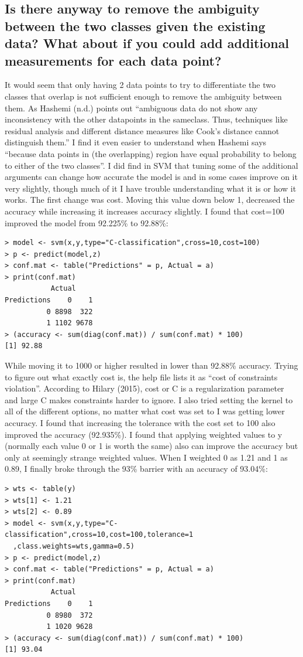 \documentclass[10pt]{article}
\begin{document}
\subsection*{Is there anyway to remove the ambiguity between the two classes given the existing data?  What about if you could add additional measurements for each data point?}
It would seem that only having 2 data points to try to differentiate the two classes that overlap is not sufficient enough to remove the ambiguity between them. As Hashemi (n.d.) points out “ambiguous data do not show any inconsistency with the other datapoints in the sameclass. Thus, techniques like residual analysis and different distance measures like Cook’s distance cannot distinguish them.” I find it even easier to understand when Hashemi says “because data points in (the overlapping) region have equal probability to belong to either of the two classes”. I did find in SVM that tuning some of the additional arguments can change how accurate the model is and in some cases improve on it very slightly, though much of it I have trouble understanding what it is or how it works. The first change was cost. Moving this value down below 1, decreased the accuracy while increasing it increases accuracy slightly. I found that cost=100 improved the model from 92.225\% to 92.88\%: 
\begin{verbatim}
> model <- svm(x,y,type="C-classification",cross=10,cost=100) 
> p <- predict(model,z) 
> conf.mat <- table("Predictions" = p, Actual = a) 
> print(conf.mat) 
           Actual 
Predictions    0    1 
          0 8898  322 
          1 1102 9678 
> (accuracy <- sum(diag(conf.mat)) / sum(conf.mat) * 100) 
[1] 92.88 
\end{verbatim}
While moving it to 1000 or higher resulted in lower than 92.88\% accuracy. Trying to figure out what exactly cost is, the help file lists it as “cost of constraints violation”. According to Hilary (2015), cost or C is a regularization parameter and large C makes constraints harder to ignore. I also tried setting the kernel to all of the different options, no matter what cost was set to I was getting lower accuracy. I found that increasing the tolerance with the cost set to 100 also improved the accuracy (92.935\%). I found that applying weighted values to y (normally each value 0 or 1 is worth the same) also can improve the accuracy but only at seemingly strange weighted values. When I weighted 0 as 1.21 and 1 as 0.89, I finally broke through the 93\% barrier with an accuracy of 93.04\%: 
\begin{verbatim}
> wts <- table(y) 
> wts[1] <- 1.21 
> wts[2] <- 0.89 
> model <- svm(x,y,type="C-classification",cross=10,cost=100,tolerance=1
  ,class.weights=wts,gamma=0.5) 
> p <- predict(model,z) 
> conf.mat <- table("Predictions" = p, Actual = a) 
> print(conf.mat) 
           Actual 
Predictions    0    1 
          0 8980  372 
          1 1020 9628 
> (accuracy <- sum(diag(conf.mat)) / sum(conf.mat) * 100) 
[1] 93.04 
\end{verbatim}
\end{document}
